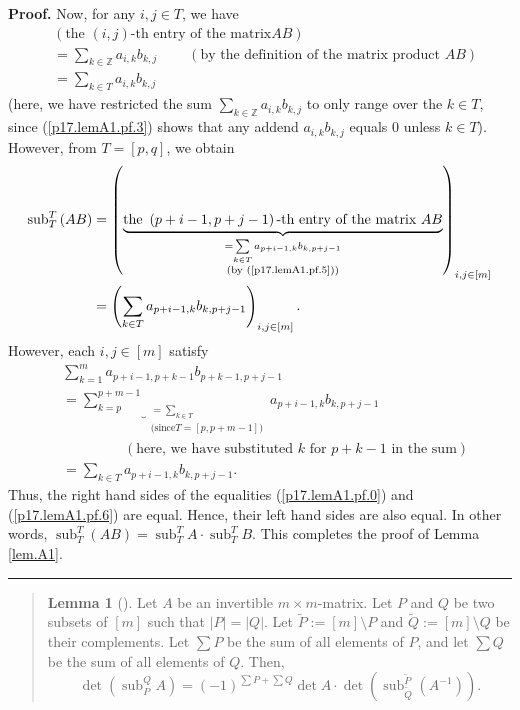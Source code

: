 \documentclass[numbers=enddot,12pt,final,onecolumn,notitlepage]{scrartcl}%
\newenvironment{statement}{\begin{quote}}{\end{quote}}
\theoremstyle{definition}
\newtheorem{lem}[theo]{Lemma}
\newenvironment{lemmain}[1][]
{\begin{statement}\begin{lem}[#1]}
{\end{lem}\end{statement}}
\newenvironment{proof}[1][Proof]{\noindent\textbf{#1.} }{\ \rule{0.5em}{0.5em}}
\newenvironment{lemmain}[1][Proof]{\noindent\textbf{#1.} }{\ \rule{0.5em}{0.5em}}
\let\sumnonlimits\sum
\renewcommand{\sum}{\sumnonlimits\limits}
\begin{document}
\begin{enumerate}
\begin{proof}
Now, for any $i,j\in T$, we have%
\begin{align}
&  \left(  \text{the }\left(  i,j\right)  \text{-th entry of the matrix
}AB\right) \nonumber\\
&  =\sum_{k\in\mathbb{Z}}a_{i,k}b_{k,j}\ \ \ \ \ \ \ \ \ \ \left(  \text{by
the definition of the matrix product }AB\right) \nonumber\\
&  =\sum_{k\in T}a_{i,k}b_{k,j} \label{p17.lemA1.pf.5}%
\end{align}
(here, we have restricted the sum $\sum_{k\in\mathbb{Z}}a_{i,k}b_{k,j}$ to
only range over the $k\in T$, since (\ref{p17.lemA1.pf.3}) shows that any
addend $a_{i,k}b_{k,j}$ equals $0$ unless $k\in T$). However, from $T=\left[
p,q\right]  $, we obtain%
\begin{align}
\operatorname*{sub}\nolimits_{T}^{T}\left(  AB\right)   &  =\left(
\underbrace{\text{the }\left(  p+i-1,p+j-1\right)  \text{-th entry of the
matrix }AB}_{\substack{=\sum_{k\in T}a_{p+i-1,k}b_{k,p+j-1}\\\text{(by
(\ref{p17.lemA1.pf.5}))}}}\right)  _{i,j\in\left[  m\right]  }\nonumber\\
&  =\left(  \sum_{k\in T}a_{p+i-1,k}b_{k,p+j-1}\right)  _{i,j\in\left[
m\right]  }. \label{p17.lemA1.pf.6}%
\end{align}
However, each $i,j\in\left[  m\right]  $ satisfy%
\begin{align*}
&  \sum_{k=1}^{m}a_{p+i-1,p+k-1}b_{p+k-1,p+j-1}\\
&  =\underbrace{\sum_{k=p}^{p+m-1}}_{\substack{=\sum_{k\in T}\\\text{(since
}T=\left[  p,p+m-1\right]  \text{)}}}a_{p+i-1,k}b_{k,p+j-1}\\
&  \ \ \ \ \ \ \ \ \ \ \ \ \ \ \ \ \ \ \ \ \left(  \text{here, we have
substituted }k\text{ for }p+k-1\text{ in the sum}\right) \\
&  =\sum_{k\in T}a_{p+i-1,k}b_{k,p+j-1}.
\end{align*}
Thus, the right hand sides of the equalities (\ref{p17.lemA1.pf.0}) and
(\ref{p17.lemA1.pf.6}) are equal. Hence, their left hand sides are also equal.
In other words, $\operatorname*{sub}\nolimits_{T}^{T}\left(  AB\right)
=\operatorname*{sub}\nolimits_{T}^{T}A\cdot\operatorname*{sub}\nolimits_{T}%
^{T}B$. This completes the proof of Lemma \ref{lem.A1}.
\end{proof}

\begin{lemmain}
\label{lem.A2}Let $A$ be an invertible $m\times m$-matrix. Let $P$ and $Q$ be
two subsets of $\left[  m\right]  $ such that $\left\vert P\right\vert
=\left\vert Q\right\vert $. Let $\widetilde{P}:=\left[  m\right]  \setminus P$
and $\widetilde{Q}:=\left[  m\right]  \setminus Q$ be their complements. Let
$\sum P$ be the sum of all elements of $P$, and let $\sum Q$ be the sum of all
elements of $Q$. Then,%
\[
\det\left(  \operatorname*{sub}\nolimits_{P}^{Q}A\right)  =\left(  -1\right)
^{\sum P+\sum Q}\det A\cdot\det\left(  \operatorname*{sub}%
\nolimits_{\widetilde{Q}}^{\widetilde{P}}\left(  A^{-1}\right)  \right)  .
\]


\end{lemmain}
\end{enumerate}
\end{document}
